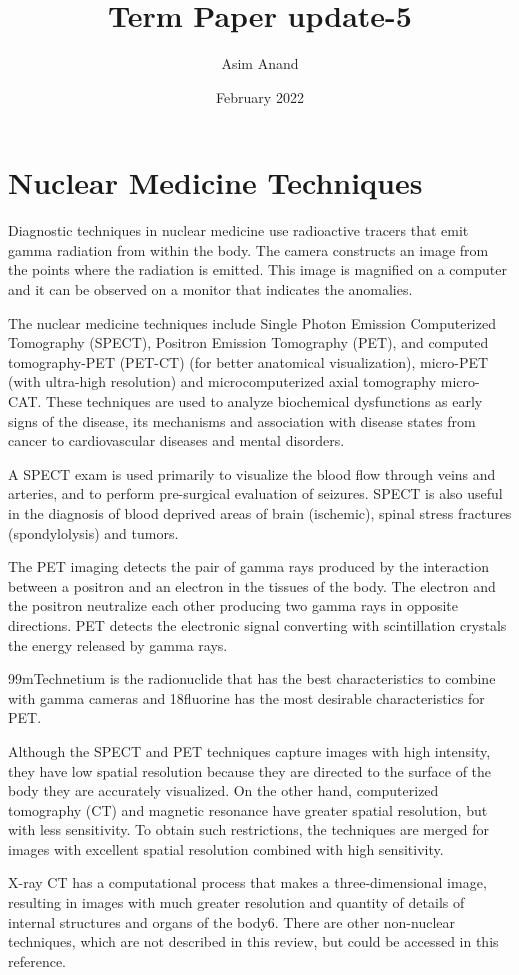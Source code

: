 \documentclass{article}
\title{Term Paper update-5}
\author{Asim Anand}
\date{February 2022}
\begin{document}
\maketitle

\section{Nuclear Medicine Techniques}
Diagnostic techniques in nuclear medicine use radioactive tracers that emit gamma radiation from within the body. The camera constructs an image from the points where the radiation is emitted. This image is magnified on a computer  and it can be observed  on  a  monitor  that  indicates  the anomalies.

The nuclear medicine techniques include Single Photon  Emission  Computerized  Tomography (SPECT), Positron Emission Tomography (PET), and  computed  tomography-PET  (PET-CT)  (for better anatomical visualization), micro-PET (with ultra-high resolution) and microcomputerized axial tomography  micro-CAT.  These techniques  are used to analyze biochemical dysfunctions as early signs  of  the disease,  its  mechanisms  and association  with  disease  states  from  cancer  to cardiovascular diseases and mental disorders.

A SPECT exam is  used primarily to visualize the blood flow through veins and arteries, and to perform  pre-surgical  evaluation  of  seizures. SPECT  is also useful  in the  diagnosis of  blood deprived  areas of  brain  (ischemic),  spinal  stress fractures (spondylolysis) and tumors.

The PET  imaging detects  the pair of  gamma rays produced by the interaction between a positron and  an electron  in  the tissues  of  the body.  The electron and  the  positron  neutralize  each  other producing two gamma rays in opposite directions. PET detects the electronic signal converting with scintillation crystals the energy released by gamma rays.

99mTechnetium is the radionuclide that has the best  characteristics  to  combine  with  gamma cameras  and  18fluorine  has  the  most  desirable characteristics for PET.

Although  the  SPECT  and  PET  techniques capture images with high intensity, they have low spatial resolution because they are directed to the surface of the body they are accurately visualized. On the other hand, computerized tomography (CT) and  magnetic  resonance  have  greater  spatial resolution, but with less sensitivity. To obtain such restrictions, the techniques are merged for images with  excellent  spatial  resolution  combined  with high sensitivity.

X-ray  CT  has  a  computational  process  that makes  a  three-dimensional  image,  resulting  in images with much greater resolution and quantity of details of internal structures and organs of the body6.  There  are  other  non-nuclear  techniques, which are not described in this review, but could be accessed in this reference.
\end{document}
